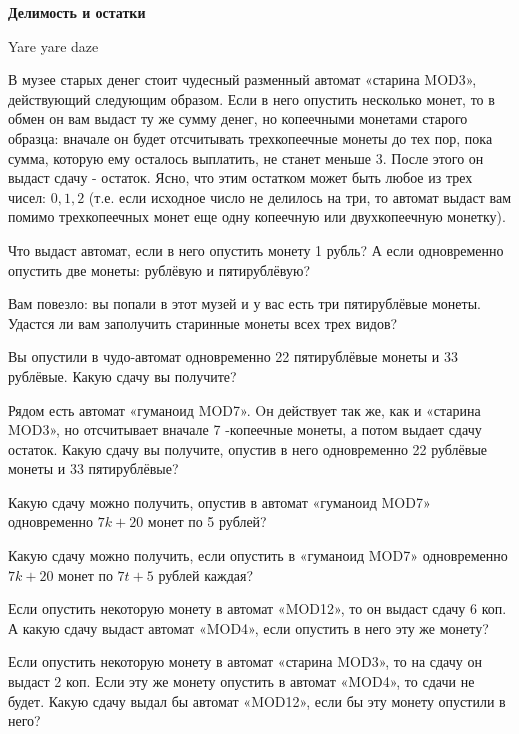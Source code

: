 \centerline{\bf \Huge Делимость и остатки}

\begin{flushright}
        \scriptsize{Yare yare daze}
\end{flushright}

В музее старых денег стоит чудесный разменный автомат «старина MOD3», действующий следующим образом. Если в него опустить несколько монет, то в обмен он вам выдаст ту же сумму денег, но копеечными монетами старого образца: вначале он будет отсчитывать трехкопеечные монеты до тех пор, пока сумма, которую ему осталось выплатить, не станет меньше 3. После этого он выдаст сдачу - остаток. Ясно, что этим остатком может быть любое из трех чисел: $0,1,2$ (т.е. если исходное число не делилось на три, то автомат выдаст вам помимо трехкопеечных монет еще одну копеечную или двухкопеечную монетку).


Что выдаст автомат, если в него опустить монету 1 рубль? А если одновременно опустить две монеты: рублёвую и пятирублёвую?

Вам повезло: вы попали в этот музей и у вас есть три пятирублёвые монеты. Удастся ли вам заполучить старинные монеты всех трех видов?

Вы опустили в чудо-автомат одновременно 22 пятирублёвые монеты и 33 рублёвые. Какую сдачу вы получите?

Рядом есть автомат «гуманоид MOD7». Oн действует так же, как и «старина MOD3», но отсчитывает вначале 7 -копеечные монеты, а потом выдает сдачу остаток. Какую сдачу вы получите, опустив в него одновременно 22 рублёвые монеты и 33 пятирублёвые?

Какую сдачу можно получить, опустив в автомат «гуманоид MOD7» одновременно $7 k+20$ монет по 5 рублей?

Какую сдачу можно получить, если опустить в «гуманоид MOD7» одновременно $7 k+20$ монет по $7 t+5$ рублей каждая?

Если опустить некоторую монету в автомат «MOD12», то он выдаст сдачу 6 коп. А какую сдачу выдаст автомат «MOD4», если опустить в него эту же монету?

Если опустить некоторую монету в автомат «старина MOD3», то на сдачу он выдаст 2 коп. Если эту же монету опустить в автомат «MOD4», то сдачи не будет. Какую сдачу выдал бы автомат «MOD12», если бы эту монету опустили в него?